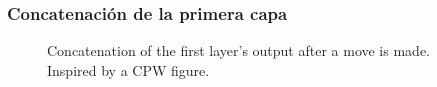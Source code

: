 \begin{frame}
\frametitle{Concatenación de la primera capa}
\begin{figure}[H]
\centering
{}
\caption{Concatenation of the first layer's output after a move is made. Inspired by a CPW figure.}
\end{figure}
\end{frame}

